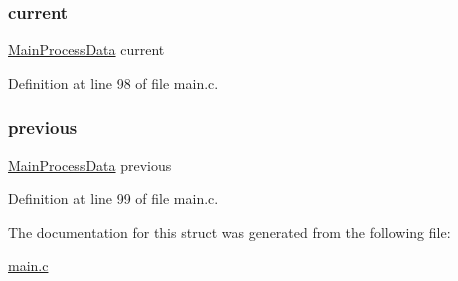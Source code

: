\subsubsection{\texorpdfstring{current}{current}}
{\footnotesize\ttfamily \mbox{\hyperlink{main_8c_a10c0332e7cd68abe97ec61fa4ac93383}{Main\+Process\+Data}} current}



Definition at line 98 of file main.\+c.

\mbox{\label{struct_app_data___a57a5b5fd3e09c0d8651bffc358acd3c4}} 
\subsubsection{\texorpdfstring{previous}{previous}}
{\footnotesize\ttfamily \mbox{\hyperlink{main_8c_a10c0332e7cd68abe97ec61fa4ac93383}{Main\+Process\+Data}} previous}



Definition at line 99 of file main.\+c.



The documentation for this struct was generated from the following file\+:\begin{DoxyCompactItemize}
\item 
\mbox{\hyperlink{main_8c}{main.\+c}}\end{DoxyCompactItemize}
